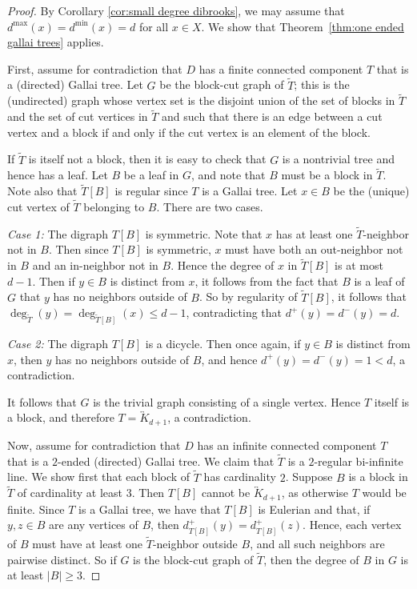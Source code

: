 \documentclass[psamsfonts]{amsart}
\theoremstyle{definition}
\theoremstyle{remark}
\numberwithin{equation}{section}
\begin{document}
\begin{proof}
    By Corollary \ref{cor:small degree dibrooks}, we may assume that $d^{\max}(x) = d^{\min}(x) = d$ for all $x \in X$. We show that Theorem~\ref{thm:one ended gallai trees} applies. 
    
    First, assume for contradiction that $D$ has a finite connected component $T$ that is a (directed) Gallai tree. Let $G$ be the block-cut graph of $\tilde{T}$; this is the (undirected) graph whose vertex set is the disjoint union of the set of blocks in $\tilde{T}$ and the set of cut vertices in $\tilde{T}$ and such that there is an edge between a cut vertex and a block if and only if the cut vertex is an element of the block. 
    
    If $\tilde{T}$ is itself not a block, then it is easy to check that $G$ is a nontrivial tree and hence has a leaf. Let $B$ be a leaf in $G$, and note that $B$ must be a block in $\tilde{T}$. Note also that $\tilde{T}[B]$ is regular since $T$ is a Gallai tree. Let $x \in B$ be the (unique) cut vertex of $\tilde{T}$ belonging to $B$. There are two cases.

    {\it Case 1:} The digraph $T[B]$ is symmetric. Note that $x$ has at least one $\tilde{T}$-neighbor not in $B$. Then since $T[B]$ is symmetric, $x$ must have both an out-neighbor not in $B$ and an in-neighbor not in $B$. Hence the degree of $x$ in $\tilde{T}[B]$ is at most $d - 1$. Then if $y \in B$ is distinct from $x$, it follows from the fact that $B$ is a leaf of $G$ that $y$ has no neighbors outside of $B$. So by regularity of $\tilde{T}[B]$, it follows that $\deg_{\tilde{T}}(y) = \deg_{\tilde{T}[B]}(x) \leq d - 1$, contradicting that $d^+(y) = d^-(y) = d$.

    {\it Case 2:} The digraph $T[B]$ is a dicycle. Then once again, if $y \in B$ is distinct from $x$, then $y$ has no neighbors outside of $B$, and hence $d^+(y) = d^-(y) = 1 < d$, a contradiction.

    It follows that $G$ is the trivial graph consisting of a single vertex. Hence $T$ itself is a block, and therefore $T = \overleftrightarrow{K}_{d + 1}$, a contradiction.

    Now, assume for contradiction that $D$ has an infinite connected component $T$ that is a $2$-ended (directed) Gallai tree. We claim that $\tilde{T}$ is a $2$-regular bi-infinite line. We show first that each block of $\tilde{T}$ has cardinality $2$. Suppose $B$ is a block in $\tilde{T}$ of cardinality at least $3$. Then $T[B]$ cannot be $\overleftrightarrow{K}_{d + 1}$, as otherwise $T$ would be finite. Since $T$ is a Gallai tree, we have that $T[B]$ is Eulerian and that, if $y, z \in B$ are any vertices of $B$, then $d^+_{T[B]}(y) = d^+_{T[B]}(z)$. Hence, each vertex of $B$ must have at least one $\tilde{T}$-neighbor outside $B$, and all such neighbors are pairwise distinct. So if $G$ is the block-cut graph of $\tilde{T}$, then the degree of $B$ in $G$ is at least $\vert B \vert \geq 3$.


\end{proof}
\end{document}
